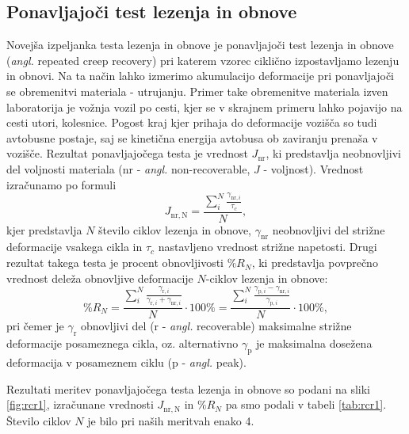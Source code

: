 \documentclass{article}
\begin{document}
\subsection{Ponavljajoči test lezenja in obnove}

Novejša izpeljanka testa lezenja in obnove je ponavljajoči test lezenja in obnove (\textit{angl.} repeated creep recovery) pri katerem vzorec ciklično izpostavljamo lezenju in obnovi. Na ta način lahko izmerimo akumulacijo deformacije pri ponavljajoči se obremenitvi materiala - utrujanju. Primer take obremenitve materiala izven laboratorija je vožnja vozil po cesti, kjer se v skrajnem primeru lahko pojavijo na cesti utori, kolesnice. Pogost kraj kjer prihaja do deformacije vozišča so tudi avtobusne postaje, saj se kinetična energija avtobusa ob zaviranju prenaša v vozišče.
Rezultat ponavljajočega testa je vrednost $J_\mathrm{nr}$, ki predstavlja neobnovljivi del voljnosti materiala ($\mathrm{nr}$ - \textit{angl.} non-recoverable, $J$ - voljnost). Vrednost izračunamo po formuli
\begin{equation}
J_\mathrm{nr, N} = \frac{\sum\limits^N_i\frac{\gamma_{\mathrm{nr},i}}{\tau_c}}{N},
\end{equation}
kjer predstavlja $N$ število ciklov lezenja in obnove, $\gamma_{\mathrm{nr}}$ neobnovljivi del strižne deformacije vsakega cikla in $\tau_c$ nastavljeno vrednost strižne napetosti. Drugi rezultat takega testa je procent obnovljivosti $\%R_N$, ki predstavlja povprečno vrednost deleža obnovljive deformacije $N$-ciklov lezenja in obnove:
\begin{equation}
\%R_N = \frac{\sum\limits^N_i\frac{\gamma_{\mathrm{r},i}}{\gamma_{\mathrm{r},i}+\gamma_{\mathrm{nr},i}}}{N} \cdot 100 \% = \frac{\sum\limits^N_i\frac{\gamma_{\mathrm{p},i}-\gamma_{\mathrm{nr},i}}{\gamma_{\mathrm{p},i}}}{N} \cdot 100 \%,
\end{equation}
pri čemer je $\gamma_{\mathrm{r}}$ obnovljivi del ($\mathrm{r}$ - \textit{angl.} recoverable) maksimalne strižne deformacije posameznega cikla, oz. alternativno $\gamma_{\mathrm{p}}$ je maksimalna dosežena deformacija v posameznem ciklu ($\mathrm{p}$ - \textit{angl.} peak).

Rezultati meritev ponavljajočega testa lezenja in obnove so podani na sliki \ref{fig:rcr1}, izračunane vrednosti $J_\mathrm{nr, N}$ in $\%R_N$ pa smo podali v tabeli \ref{tab:rcr1}. Število ciklov $N$ je bilo pri naših meritvah enako 4.
\end{document}
